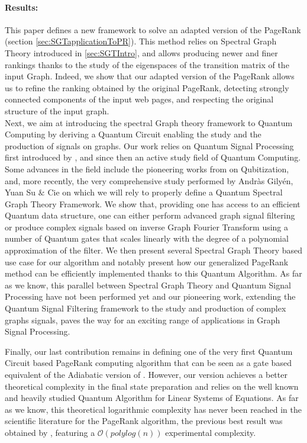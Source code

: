 \documentclass{article}
\begin{document}
\paragraph{Results:}
This paper defines a new framework to solve an adapted version of the PageRank (section \ref{sec:SGTapplicationToPR}). This method relies on Spectral Graph Theory introduced in \ref{sec:SGTIntro}, and allows producing newer and finer rankings thanks to the study of the eigenspaces of the transition matrix of the input Graph. Indeed, we show that our adapted version of the PageRank allows us to refine the ranking obtained by the original PageRank, detecting strongly connected components of the input web pages, and respecting the original structure of the input graph.   \\

Next, we aim at introducing the spectral Graph theory framework to Quantum Computing by deriving a Quantum Circuit enabling the study and the production of signals on graphs. Our work relies on Quantum Signal Processing first introduced by \cite{eldar_oppenheim_2002}, and since then an active study field of Quantum Computing. Some advances in the field include the pioneering works from \cite{Low_2019} on Qubitization, and, more recently, the very comprehensive study performed by Andràs Gilyén, Yuan Su $\&$ Cie \cite{gilyén_su_low_wiebe_2019} on which we will rely to properly define a Quantum Spectral Graph Theory Framework. We show that, providing one has access to an efficient Quantum data structure, one can either perform advanced graph signal filtering or produce complex signals based on inverse Graph Fourier Transform using a number of Quantum gates that scales linearly with the degree of a polynomial approximation of the filter. We then present several Spectral Graph Theory based use case for our algorithm and notably present how our generalized PageRank method can be efficiently implemented thanks to this Quantum Algorithm. As far as we know, this parallel between Spectral Graph Theory and Quantum Signal Processing have not been performed yet and our pioneering work, extending the Quantum Signal Filtering framework to the study and production of complex graphs signals, paves the way for an exciting range of applications in Graph Signal Processing.

Finally, our last contribution remains in defining one of the very first Quantum Circuit based PageRank computing algorithm that can be seen as a gate based equivalent of the Adiabatic version of \cite{garnerone_zanardi_lidar_2012}. However, our version achieves a better theoretical complexity in the final state preparation and relies on the well known and heavily studied Quantum Algorithm for Linear Systems of Equations.
As far as we know, this theoretical logarithmic complexity has never been reached in the scientific literature for the PageRank algorithm, the previous best result was obtained by \cite{garnerone_zanardi_lidar_2012}, featuring a $\mathcal{O}(polylog(n))$ experimental complexity. \\
\end{document}
